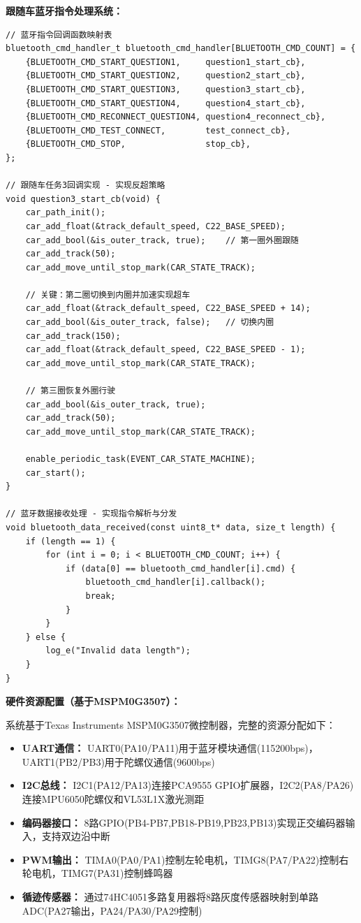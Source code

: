 \documentclass[UTF8]{ctexart}
\begin{document}
\textbf{跟随车蓝牙指令处理系统：}

\begin{verbatim}
// 蓝牙指令回调函数映射表
bluetooth_cmd_handler_t bluetooth_cmd_handler[BLUETOOTH_CMD_COUNT] = {
    {BLUETOOTH_CMD_START_QUESTION1,     question1_start_cb},
    {BLUETOOTH_CMD_START_QUESTION2,     question2_start_cb},
    {BLUETOOTH_CMD_START_QUESTION3,     question3_start_cb},
    {BLUETOOTH_CMD_START_QUESTION4,     question4_start_cb},
    {BLUETOOTH_CMD_RECONNECT_QUESTION4, question4_reconnect_cb},
    {BLUETOOTH_CMD_TEST_CONNECT,        test_connect_cb},
    {BLUETOOTH_CMD_STOP,                stop_cb},
};

// 跟随车任务3回调实现 - 实现反超策略
void question3_start_cb(void) {
    car_path_init();
    car_add_float(&track_default_speed, C22_BASE_SPEED);
    car_add_bool(&is_outer_track, true);    // 第一圈外圈跟随
    car_add_track(50);
    car_add_move_until_stop_mark(CAR_STATE_TRACK);
    
    // 关键：第二圈切换到内圈并加速实现超车
    car_add_float(&track_default_speed, C22_BASE_SPEED + 14);
    car_add_bool(&is_outer_track, false);   // 切换内圈
    car_add_track(150);           
    car_add_float(&track_default_speed, C22_BASE_SPEED - 1);
    car_add_move_until_stop_mark(CAR_STATE_TRACK);
    
    // 第三圈恢复外圈行驶
    car_add_bool(&is_outer_track, true);
    car_add_track(50);           
    car_add_move_until_stop_mark(CAR_STATE_TRACK);
    
    enable_periodic_task(EVENT_CAR_STATE_MACHINE);
    car_start();
}

// 蓝牙数据接收处理 - 实现指令解析与分发
void bluetooth_data_received(const uint8_t* data, size_t length) {
    if (length == 1) {
        for (int i = 0; i < BLUETOOTH_CMD_COUNT; i++) {
            if (data[0] == bluetooth_cmd_handler[i].cmd) {
                bluetooth_cmd_handler[i].callback();
                break;
            }
        }
    } else {
        log_e("Invalid data length");
    }
}
\end{verbatim}

\textbf{硬件资源配置（基于MSPM0G3507）：}

系统基于Texas Instruments MSPM0G3507微控制器，完整的资源分配如下：

\begin{itemize}
    \item \textbf{UART通信：} UART0(PA10/PA11)用于蓝牙模块通信(115200bps)，UART1(PB2/PB3)用于陀螺仪通信(9600bps)
    \item \textbf{I2C总线：} I2C1(PA12/PA13)连接PCA9555 GPIO扩展器，I2C2(PA8/PA26)连接MPU6050陀螺仪和VL53L1X激光测距
    \item \textbf{编码器接口：} 8路GPIO(PB4-PB7,PB18-PB19,PB23,PB13)实现正交编码器输入，支持双边沿中断
    \item \textbf{PWM输出：} TIMA0(PA0/PA1)控制左轮电机，TIMG8(PA7/PA22)控制右轮电机，TIMG7(PA31)控制蜂鸣器
    \item \textbf{循迹传感器：} 通过74HC4051多路复用器将8路灰度传感器映射到单路ADC(PA27输出，PA24/PA30/PA29控制)
\end{itemize}
\end{document}
